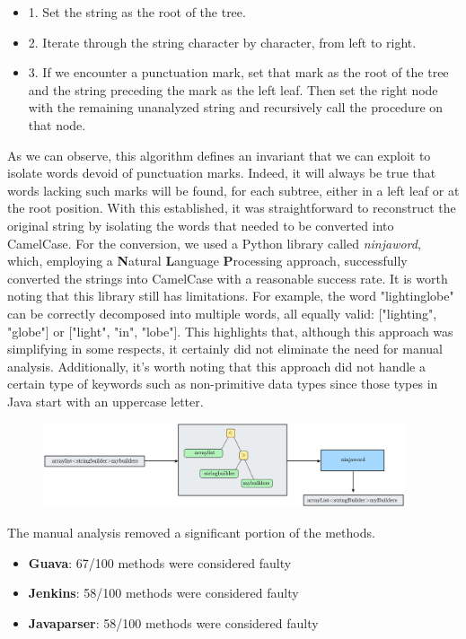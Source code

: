 \begin{itemize}
	\item 1. Set the string as the root of the tree.
	\item 2. Iterate through the string character by character, from left to right.
	\item 3. If we encounter a punctuation mark, set that mark as the root of the tree and the string preceding the mark as the left leaf. Then set the right node with the remaining unanalyzed string and recursively call the procedure on that node.
\end{itemize}
As we can observe, this algorithm defines an invariant that we can exploit to isolate words devoid of punctuation marks. Indeed, it will always be true that words lacking such marks will be found, for each subtree, either in a left leaf or at the root position. With this established, it was straightforward to reconstruct the original string by isolating the words that needed to be converted into CamelCase. For the conversion, we used a Python library called \textit{ninjaword}, which, employing a \textbf{N}atural \textbf{L}anguage \textbf{P}rocessing approach, successfully converted the strings into CamelCase with a reasonable success rate. It is worth noting that this library still has limitations. For example, the word "lightinglobe" can be correctly decomposed into multiple words, all equally valid: ["lighting", "globe"] or ["light", "in", "lobe"]. This highlights that, although this approach was simplifying in some respects, it certainly did not eliminate the need for manual analysis. Additionally, it's worth noting that this approach did not handle a certain type of keywords such as non-primitive data types since those types in Java start with an uppercase letter.
\begin{figure}[H]
	\begin{center}
		\includegraphics[width=0.95\textwidth]{figs/clay.png}
	\end{center}
	\caption{}\label{fig:To camelCase algorithm}
\end{figure}
The manual analysis removed a significant portion of the methods.
\begin{itemize}
	\item \textbf{Guava}: 67/100 methods were considered faulty
	\item \textbf{Jenkins}: 58/100 methods were considered faulty
	\item \textbf{Javaparser}: 58/100 methods were considered faulty
\end{itemize}
